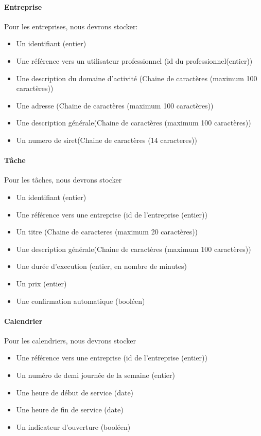 \documentclass{article}
\begin{document}
\begin{itemize}
\paragraph{Entreprise}
Pour les entreprises, nous devrons stocker:
\begin{itemize}
\item Un identifiant (entier)
\item Une référence vers un utilisateur professionnel (id du professionnel(entier)) 
\item Une description du domaine d'activité (Chaine de caractères (maximum 100 caractères))
\item Une adresse (Chaine de caractères (maximum 100 caractères))
\item Une description générale(Chaine de caractères (maximum 100 caractères))
\item Un numero de siret(Chaine de caractères (14 caracteres))
\end{itemize}

\paragraph{Tâche}
Pour les tâches, nous devrons stocker
\begin{itemize}
\item Un identifiant (entier)
\item Une référence vers une entreprise (id de l'entreprise (entier))
\item Un titre (Chaine de caracteres (maximum 20 caractères))
\item Une description générale(Chaine de caractères (maximum 100 caractères))
\item Une durée d'execution (entier, en nombre de minutes)
\item Un prix (entier)
\item Une confirmation automatique (booléen)
\end{itemize}

\paragraph{Calendrier}
Pour les calendriers, nous devrons stocker
\begin{itemize}
\item Une référence vers une entreprise (id de l'entreprise (entier))
\item Un numéro de demi journée de la semaine (entier)
\item Une heure de début de service (date)
\item Une heure de fin de service (date)
\item Un indicateur d'ouverture (booléen)
\end{itemize}


\end{itemize}
\end{document}
